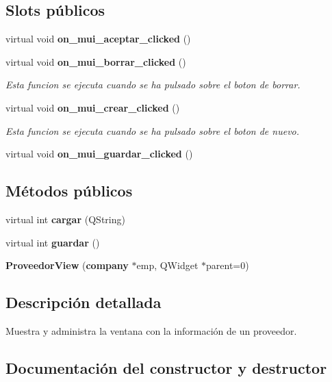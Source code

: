 \subsection*{Slots p\'{u}blicos}
\begin{CompactItemize}
\item 
virtual void {\bf on\_\-mui\_\-aceptar\_\-clicked} ()\label{classProveedorView_i0}

\item 
virtual void {\bf on\_\-mui\_\-borrar\_\-clicked} ()\label{classProveedorView_i1}

\begin{CompactList}\small\item\em Esta funcion se ejecuta cuando se ha pulsado sobre el boton de borrar. \item\end{CompactList}\item 
virtual void {\bf on\_\-mui\_\-crear\_\-clicked} ()\label{classProveedorView_i2}

\begin{CompactList}\small\item\em Esta funcion se ejecuta cuando se ha pulsado sobre el boton de nuevo. \item\end{CompactList}\item 
virtual void {\bf on\_\-mui\_\-guardar\_\-clicked} ()\label{classProveedorView_i3}

\end{CompactItemize}
\subsection*{M\'{e}todos p\'{u}blicos}
\begin{CompactItemize}
\item 
virtual int {\bf cargar} (QString)
\item 
virtual int {\bf guardar} ()
\item 
{\bf Proveedor\-View} ({\bf company} $\ast$emp, QWidget $\ast$parent=0)
\end{CompactItemize}


\subsection{Descripci\'{o}n detallada}
Muestra y administra la ventana con la informaci\'{o}n de un proveedor. 



\subsection{Documentaci\'{o}n del constructor y destructor}
